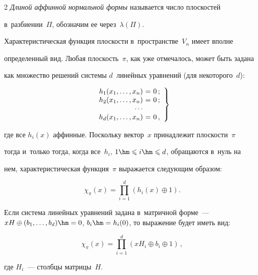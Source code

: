 \begin{multicols}{2}
\textit{Длиной аффинной нормальной формы} называется число плоскостей 


в~разбиении~$\Pi$, обозначим ее через~$\lambda(\Pi)$.





Характеристическая функция плоскости в~пространстве~$V_n$ имеет вполне 


определенный вид. Любая плоскость~$\pi$, как уже отмечалось, может быть задана 


как множество решений системы $d$~линейных уравнений (для некоторого~$d$):


\begin{equation}


\label{chi-system}


  \left.


    \begin{array}{r@{\ }c@{\ }l}


        h_1(x_1,\ldots,x_n)&=&0\,;\\


        h_2(x_1,\ldots,x_n)&=&0\,;\\


        \cdots\\


        h_d(x_1,\ldots,x_n)&=&0\,,\\


    \end{array}


  \right\}


\end{equation}


где все $h_i(x)$ аффинные. Поскольку вектор~$x$ принадлежит плоскости~$\pi$ 


тогда и~только тогда, когда все~$h_i$, $1\hm\leqslant i\hm\leqslant d$, обращаются в~нуль на 


нем, характеристическая функция~$\pi$ выражается следующим образом:


$$\chi_{\pi}(x)=\prod_{i=1}^d (h_i(x)\oplus 1).$$


Если система линейных уравнений задана в~мат\-рич\-ной форме~--- $xH\oplus 


(b_1,\ldots,b_d)\hm=0$, $b_i\hm=h_i(0)$, то выражение будет иметь вид:


$$


\chi_{\pi}(x)=\prod\limits_{i=1}^d \left(xH_i\oplus b_i\oplus 1\right)\,,$$


где $H_i$~--- столбцы матрицы~$H$.






\end{multicols}
